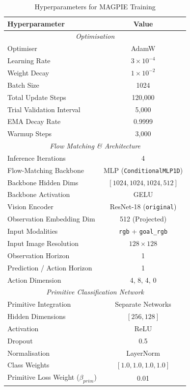 \documentclass[journal]{IEEEtran}
\begin{document}
\begin{table}[!t]
\centering
\caption{Hyperparameters for MAGPIE Training}
\label{tab:hyperparameters}
\begin{tabular}{lc}
\toprule
\textbf{Hyperparameter} & \textbf{Value} \\
\midrule
\multicolumn{2}{c}{\textit{Optimisation}} \\
\midrule
Optimiser & AdamW \\
Learning Rate & $3 \times 10^{-4}$ \\
Weight Decay & $1 \times 10^{-2}$ \\
Batch Size & 1024 \\
Total Update Steps & 120,000 \\
Trial Validation Interval & 5,000 \\
EMA Decay Rate & 0.9999 \\
Warmup Steps & 3,000 \\
\midrule
\multicolumn{2}{c}{\textit{Flow Matching \& Architecture}} \\
\midrule
Inference Iterations & 4 \\
Flow-Matching Backbone & MLP (\texttt{ConditionalMLP1D}) \\
Backbone Hidden Dims & $[1024, 1024, 1024, 512]$ \\
Backbone Activation & GELU \\
Vision Encoder & ResNet-18 (\texttt{original}) \\
Observation Embedding Dim & 512 (Projected) \\
Input Modalities & \texttt{rgb} + \texttt{goal\_rgb} \\
Input Image Resolution & $128 \times 128$ \\
Observation Horizon & 1 \\
Prediction / Action Horizon & 1 \\
Action Dimension & 4, 8, 4, 0 \\
\midrule
\multicolumn{2}{c}{\textit{Primitive Classification Network}} \\
\midrule
Primitive Integration & Separate Networks \\
Hidden Dimensions & $[256, 128]$ \\
Activation & ReLU \\
Dropout & 0.5 \\
Normalisation & LayerNorm \\
Class Weights & $[1.0, 1.0, 1.0, 1.0]$ \\
Primitive Loss Weight ($\beta_{prim}$) & 0.01 \\
\bottomrule
\end{tabular}
\end{table}
\end{document}

